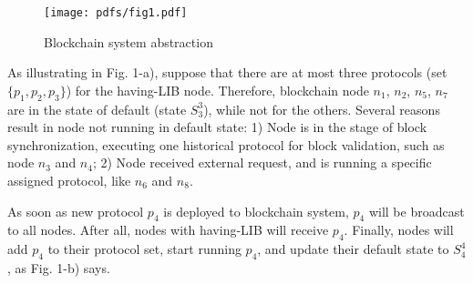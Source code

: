 \documentclass[sigplan,screen]{acmart}
\begin{document}
\begin{figure}
  \texttt{[image: pdfs/fig1.pdf]}
  \caption{Blockchain system abstraction}
\end{figure}

As illustrating in Fig. 1-a), suppose that there are at most three protocols
(set $\{p_1,p_2,p_3\}$) for the having-LIB node. Therefore,
blockchain node $n_1$, $n_2$, $n_5$, $n_7$ are in the state of default
(state $S_3^3$), while not for the others. Several reasons result in node not
running in default state: 1) Node is in the stage of block synchronization,
executing one historical protocol for block validation, such as node $n_3$ and
$n_4$; 2) Node received external request, and is running a specific assigned
protocol, like $n_6$ and $n_8$.

As soon as new protocol $p_4$ is deployed to blockchain system,
$p_4$ will be broadcast to all nodes. After all, nodes with having-LIB
will receive $p_4$. Finally, nodes will add $p_4$ to their protocol set, start
running $p_4$, and update their default state to $S_4^4$, as Fig. 1-b) says.
\end{document}
